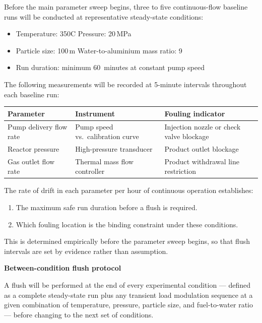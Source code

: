 \documentclass[12pt]{article}
\begin{document}
\medskip
Before the main parameter sweep begins, three to five continuous-flow baseline runs
will be conducted at representative steady-state conditions:

\begin{itemize}[itemsep=2pt]
    \item Temperature: 350\textdegree C \quad Pressure: 20\,MPa
    \item Particle size: 100\,\textmu m \quad Water-to-aluminium mass ratio: 9
    \item Run duration: minimum 60~minutes at constant pump speed
\end{itemize}

\medskip
The following measurements will be recorded at 5-minute intervals throughout each
baseline run:

\medskip
\begin{tabularx}{\linewidth}{@{} l l X @{}}
    \toprule
    \textbf{Parameter} & \textbf{Instrument} & \textbf{Fouling indicator} \\
    \midrule
    Pump delivery flow rate
        & Pump speed vs.\ calibration curve
        & Injection nozzle or check valve blockage \\[4pt]
    Reactor pressure
        & High-pressure transducer
        & Product outlet blockage \\[4pt]
    Gas outlet flow rate
        & Thermal mass flow controller
        & Product withdrawal line restriction \\
    \bottomrule
\end{tabularx}

\medskip
The rate of drift in each parameter per hour of continuous operation establishes:
\begin{enumerate}[label=\arabic*., itemsep=2pt]
    \item The maximum safe run duration before a flush is required.
    \item Which fouling location is the binding constraint under these conditions.
\end{enumerate}

This is determined empirically before the parameter sweep begins, so that flush
intervals are set by evidence rather than assumption.

\bigskip
\noindent\textbf{Between-condition flush protocol}

\medskip
A flush will be performed at the end of every experimental condition --- defined as
a complete steady-state run plus any transient load modulation sequence at a given
combination of temperature, pressure, particle size, and fuel-to-water ratio ---
before changing to the next set of conditions.
\end{document}
